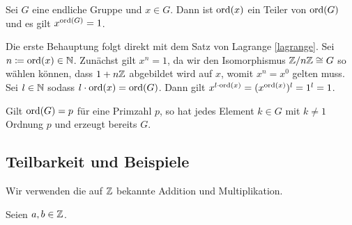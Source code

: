 \begin{satz}
  Sei \(G\) eine endliche Gruppe und \(x\in G\).
  Dann ist \(\mathrm{ord}(x)\) ein Teiler von \(\mathrm{ord}(G)\) und es gilt \(x^{\mathrm{ord}(G)}=1\).
\end{satz}

\begin{beweis}
  Die erste Behauptung folgt direkt mit dem Satz von Lagrange \ref{lagrange}.
  Sei \(n\coloneq \mathrm{ord}(x)\in\mathbb{N}\). Zunächst gilt \(x^{n}=1\), da wir den Isomorphismus \(\mathbb{Z}/n\mathbb{Z}\cong G\) so wählen können, dass \(1+n\mathbb{Z}\) abgebildet wird auf \(x\), womit \(x^n=x^0\) gelten muss.
  Sei \(l\in\mathbb{N}\) sodass \(l\cdot \mathrm{ord}(x)=\mathrm{ord}(G)\).
  Dann gilt \(x^{l\cdot \mathrm{ord}(x)}=(x^{\mathrm{ord}(x)})^l=1^l=1\).
\end{beweis}

\begin{korollar}
  Gilt \(\mathrm{ord}(G)=p\) für eine Primzahl \(p\),
  so hat jedes Element \(k\in G\) mit \(k\neq 1\) Ordnung \(p\) und erzeugt bereits \(G\).
\end{korollar}

\subsection{Teilbarkeit und Beispiele}

Wir verwenden die auf \(\mathbb{Z}\) bekannte Addition und Multiplikation.

\begin{definition}
  Seien \(a,b\in \mathbb{Z}\).
\end{definition}

